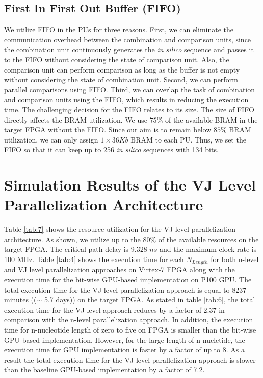 \subsection{First In First Out Buffer (FIFO)} \label{subsec:FIFO}
We utilize FIFO in the PUs for three reasons. First, we can eliminate the communication overhead between the combination and comparison units, since the combination unit continuously generates the \emph{in silico} sequence and passes it to the FIFO without considering the state of comparison unit. Also, the comparison unit can perform comparison as long as the buffer is not empty without considering the state of combination unit. 
Second, we can perform parallel comparisons using FIFO. Third, we can overlap the task of combination and comparison units using the FIFO, which results in reducing the execution time.
The challenging decision for the FIFO relates to its size. The size of FIFO directly affects the BRAM utilization. We use $75\%$ of the available BRAM in the target FPGA without the FIFO. Since our aim is to remain below $85\%$ BRAM utilization, we can only assign $1 \times 36Kb$ BRAM to each PU. Thus, we set the FIFO so that it can keep up to 256 \emph{in silico} sequences with 134 bits.   


\section{Simulation Results of the VJ Level Parallelization Architecture} \label{sec:simVJlevel}

Table \ref{tab:7} shows the resource utilization for the VJ level parallelization architecture. As shown, we utilize up to the 80\% of the available resources on the target FPGA. The critical path delay is 9.328  $ns$ and the maximum clock rate is 100 MHz. Table \ref{tab:4} shows the execution time for each $N_{Length}$ for both n-level and VJ level parallelization approaches on Virtex-7 FPGA along with the execution time for the bit-wise GPU-based implementation on P100 GPU. The total execution time for the VJ level parallelization approach is equal to 8237 minutes (($\sim$ 5.7 days)) on the target FPGA. As stated in table \ref{tab:6}, the total execution time for the VJ level approach reduces by a factor of 2.37 in comparison with the n-level parallelization approach. In addition, the execution time for n-nucleotide length of zero to five on FPGA is smaller than the bit-wise GPU-based implementation. However, for the large length of n-nucletide, the execution time for GPU implementation is faster by a factor of up to 8. As a result the total execution time for the VJ level parallelization approach is slower than the baseline GPU-based implementation by a factor of 7.2.   

